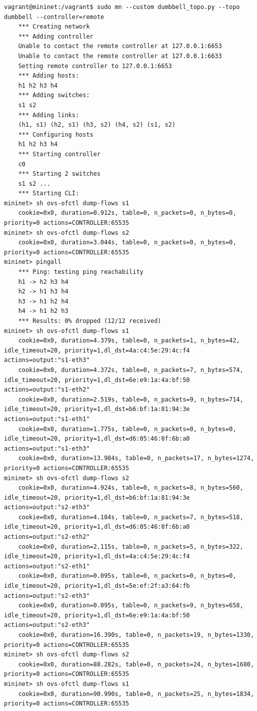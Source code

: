\documentclass{article}
\begin{document}
    \begin{verbatim}
vagrant@mininet:/vagrant$ sudo mn --custom dumbbell_topo.py --topo dumbbell --controller=remote
    *** Creating network
    *** Adding controller
    Unable to contact the remote controller at 127.0.0.1:6653
    Unable to contact the remote controller at 127.0.0.1:6633
    Setting remote controller to 127.0.0.1:6653
    *** Adding hosts:
    h1 h2 h3 h4 
    *** Adding switches:
    s1 s2 
    *** Adding links:
    (h1, s1) (h2, s1) (h3, s2) (h4, s2) (s1, s2) 
    *** Configuring hosts
    h1 h2 h3 h4 
    *** Starting controller
    c0 
    *** Starting 2 switches
    s1 s2 ...
    *** Starting CLI:
mininet> sh ovs-ofctl dump-flows s1
    cookie=0x0, duration=0.912s, table=0, n_packets=0, n_bytes=0, priority=0 actions=CONTROLLER:65535
mininet> sh ovs-ofctl dump-flows s2
    cookie=0x0, duration=3.044s, table=0, n_packets=0, n_bytes=0, priority=0 actions=CONTROLLER:65535
mininet> pingall
    *** Ping: testing ping reachability
    h1 -> h2 h3 h4 
    h2 -> h1 h3 h4 
    h3 -> h1 h2 h4 
    h4 -> h1 h2 h3 
    *** Results: 0% dropped (12/12 received)
mininet> sh ovs-ofctl dump-flows s1
    cookie=0x0, duration=4.379s, table=0, n_packets=1, n_bytes=42, idle_timeout=20, priority=1,dl_dst=4a:c4:5e:29:4c:f4 actions=output:"s1-eth3"
    cookie=0x0, duration=4.372s, table=0, n_packets=7, n_bytes=574, idle_timeout=20, priority=1,dl_dst=6e:e9:1a:4a:bf:50 actions=output:"s1-eth2"
    cookie=0x0, duration=2.519s, table=0, n_packets=9, n_bytes=714, idle_timeout=20, priority=1,dl_dst=b6:bf:1a:81:94:3e actions=output:"s1-eth1"
    cookie=0x0, duration=1.775s, table=0, n_packets=0, n_bytes=0, idle_timeout=20, priority=1,dl_dst=d6:05:46:8f:6b:a0 actions=output:"s1-eth3"
    cookie=0x0, duration=13.984s, table=0, n_packets=17, n_bytes=1274, priority=0 actions=CONTROLLER:65535
mininet> sh ovs-ofctl dump-flows s2
    cookie=0x0, duration=4.924s, table=0, n_packets=8, n_bytes=560, idle_timeout=20, priority=1,dl_dst=b6:bf:1a:81:94:3e actions=output:"s2-eth3"
    cookie=0x0, duration=4.184s, table=0, n_packets=7, n_bytes=518, idle_timeout=20, priority=1,dl_dst=d6:05:46:8f:6b:a0 actions=output:"s2-eth2"
    cookie=0x0, duration=2.115s, table=0, n_packets=5, n_bytes=322, idle_timeout=20, priority=1,dl_dst=4a:c4:5e:29:4c:f4 actions=output:"s2-eth1"
    cookie=0x0, duration=0.095s, table=0, n_packets=0, n_bytes=0, idle_timeout=20, priority=1,dl_dst=5e:ef:2f:a3:64:fb actions=output:"s2-eth3"
    cookie=0x0, duration=0.095s, table=0, n_packets=9, n_bytes=658, idle_timeout=20, priority=1,dl_dst=6e:e9:1a:4a:bf:50 actions=output:"s2-eth3"
    cookie=0x0, duration=16.390s, table=0, n_packets=19, n_bytes=1330, priority=0 actions=CONTROLLER:65535
mininet> sh ovs-ofctl dump-flows s2
    cookie=0x0, duration=88.282s, table=0, n_packets=24, n_bytes=1680, priority=0 actions=CONTROLLER:65535
mininet> sh ovs-ofctl dump-flows s1
    cookie=0x0, duration=90.990s, table=0, n_packets=25, n_bytes=1834, priority=0 actions=CONTROLLER:65535

    \end{verbatim}

    
    
\end{document}
